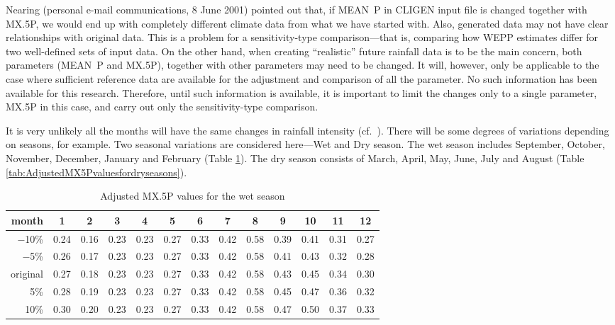 Nearing (personal e-mail communications, 8 June 2001) pointed out that, if
MEAN~P in CLIGEN input file is changed together with {MX.5P}, we would end up
with completely different climate data from what we have started with. Also,
generated data may not have clear relationships with original data. This is a
problem for a sensitivity-type comparison---that is, comparing how WEPP
estimates differ for two well-defined sets of input data. On the other hand,
when creating ``realistic'' future rainfall data is to be the main concern, both
parameters (MEAN~P and {MX.5P}), together with other parameters may need to be
changed. It will, however, only be applicable to the case where sufficient
reference data are available for the adjustment and comparison of all the
parameter. No such information has been available for this research. Therefore,
until such information is available, it is important to limit the changes only
to a single parameter, {MX.5P} in this case, and carry out only the
sensitivity-type comparison.

It is very unlikely all the months will have the same changes in rainfall
intensity (cf.\ \citet{osborn2008-changing}). There will be some degrees of
variations depending on seasons, for example. Two seasonal variations are
considered here---Wet and Dry season. The wet season includes September,
October, November, December, January and February
(Table \ref{tab:AdjustedMX5Pvaluesforwetseasons}). The dry season consists of
March, April, May, June, July and August (Table
\ref{tab:AdjustedMX5Pvaluesfordryseasons}).

\begin{table}[htbp]
  \centering
  \footnotesize
  \caption{Adjusted {MX.5P} values for the wet season}
  \label{tab:AdjustedMX5Pvaluesforwetseasons}
    \begin{tabular}{r|cc|cccccc|cccc}
      \toprule
      month & \textbf{1} & \textbf{2} & 3 & 4 &5& 6& 7& 8& \textbf{9}
&\textbf{10}& \textbf{11}& \textbf{12}\\
      \midrule
      $-$10\% & 0.24 & 0.16 & 0.23 & 0.23&  0.27 & 0.33 & 0.42 & 0.58 & 0.39 &
0.41 & 0.31 & 0.27\\
      $-$5\%  &0.26 & 0.17 & 0.23 & 0.23 & 0.27 & 0.33 & 0.42 & 0.58 & 0.41 &
0.43 & 0.32 & 0.28\\
      original & 0.27 & 0.18 & 0.23  &0.23 & 0.27 & 0.33 &0.42 & 0.58 & 0.43 &
0.45 & 0.34 & 0.30\\
      5\% & 0.28 & 0.19 & 0.23 & 0.23 & 0.27 & 0.33 & 0.42& 0.58 & 0.45 & 0.47 &
0.36 & 0.32\\
      10\% & 0.30 & 0.20 & 0.23 & 0.23 & 0.27 & 0.33 & 0.42 & 0.58 & 0.47& 0.50
& 0.37 & 0.33\\
      \bottomrule
    \end{tabular}
\end{table}

